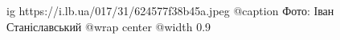  
 
 
 
 

\ifcmt
  ig https://i.lb.ua/017/31/624577f38b45a.jpeg
	@caption Фото: Іван Станіславський 
  @wrap center
  @width 0.9
\fi
